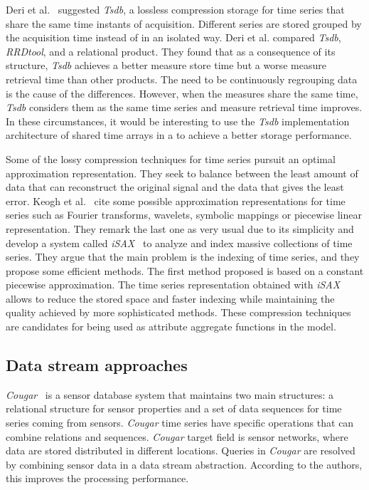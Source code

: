 Deri et al.~\cite{deri12:tsdb_compressed_database} suggested
\emph{Tsdb}, a lossless compression storage  for time
series that share the same time instants of acquisition. Different
series are stored grouped by the acquisition time instead of in an
isolated way.  Deri et al. compared \emph{Tsdb}, \emph{RRDtool}, and a
relational product. They found that as a consequence of its structure,
\emph{Tsdb} achieves a better measure store time but a worse measure
retrieval time than other products. The need to be continuously
regrouping data is the cause of the differences.  However, when
the measures share the same time, \emph{Tsdb} considers them as the
same time series and measure retrieval time improves. In these
circumstances, it would be interesting to use the \emph{Tsdb}
implementation architecture of shared time arrays in a  to
achieve a better storage performance.

Some of the lossy compression techniques for time series pursuit an
optimal approximation representation. They seek to balance between the
least amount of data that can reconstruct the original signal and the
data that gives the least error. Keogh et al.~\cite{keogh01} cite some
possible approximation representations for time series such as Fourier
transforms, wavelets, symbolic mappings or piecewise linear
representation. They remark the last one as very usual due to its
simplicity and develop a system called
\emph{iSAX}~\cite{keogh08:isax,keogh10:isax} to analyze and index
massive collections of time series. They argue that the main problem
is the indexing of time series, and they propose some efficient
methods. The first method proposed is based on a constant piecewise
approximation. The time series representation obtained with
\emph{iSAX} allows to reduce the stored space and faster indexing
while maintaining the quality achieved by more sophisticated methods.
These compression techniques are candidates for being used as
attribute aggregate functions in the  model.


\subsection{Data stream approaches}

\emph{Cougar}~\cite{bonnet01} is a sensor database system that
maintains two main structures: a relational structure for sensor
properties and a set of data sequences for time series coming from
sensors. \emph{Cougar} time series have specific operations that can
combine relations and sequences. \emph{Cougar} target field is sensor
networks, where data are stored distributed in different
locations. Queries in \emph{Cougar} are resolved by combining sensor
data in a data stream abstraction. According to the authors, this
improves the processing performance.


